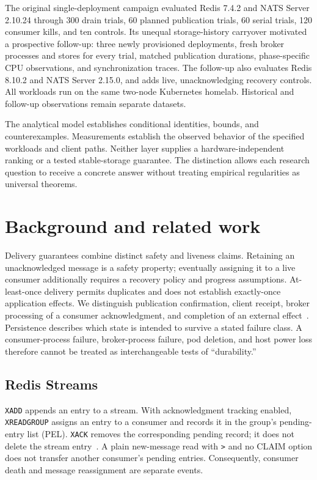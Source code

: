 \documentclass[11pt]{article}
\theoremstyle{definition}
\newcommand{\code}[1]{\texttt{#1}}
\begin{document}
The original single-deployment campaign evaluated Redis 7.4.2 and NATS Server 2.10.24 through 300 drain trials, 60 planned publication trials, 60 serial trials, 120 consumer kills, and ten controls. Its unequal storage-history carryover motivated a prospective follow-up: three newly provisioned deployments, fresh broker processes and stores for every trial, matched publication durations, phase-specific CPU observations, and synchronization traces. The follow-up also evaluates Redis 8.10.2 and NATS Server 2.15.0, and adds live, unacknowledging recovery controls. All workloads run on the same two-node Kubernetes homelab. Historical and follow-up observations remain separate datasets.

The analytical model establishes conditional identities, bounds, and counterexamples. Measurements establish the observed behavior of the specified workloads and client paths. Neither layer supplies a hardware-independent ranking or a tested stable-storage guarantee. The distinction allows each research question to receive a concrete answer without treating empirical regularities as universal theorems.

\section{Background and related work}\label{sec:background}

Delivery guarantees combine distinct safety and liveness claims. Retaining an unacknowledged message is a safety property; eventually assigning it to a live consumer additionally requires a recovery policy and progress assumptions. At-least-once delivery permits duplicates and does not establish exactly-once application effects. We distinguish publication confirmation, client receipt, broker processing of a consumer acknowledgment, and completion of an external effect~\cite{birrell1984,saltzer1984}. Persistence describes which state is intended to survive a stated failure class. A consumer-process failure, broker-process failure, pod deletion, and host power loss therefore cannot be treated as interchangeable tests of ``durability.''

\subsection{Redis Streams}

\code{XADD} appends an entry to a stream. With acknowledgment tracking enabled, \code{XREADGROUP} assigns an entry to a consumer and records it in the group's pending-entry list (PEL). \code{XACK} removes the corresponding pending record; it does not delete the stream entry~\cite{redisxreadgroup,redisxack}. A plain new-message read with \code{>} and no CLAIM option does not transfer another consumer's pending entries. Consequently, consumer death and message reassignment are separate events.
\end{document}

